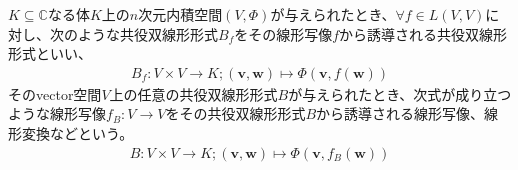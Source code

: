 \documentclass[dvipdfmx]{jsarticle}
\begin{document}
\begin{dfn}
$K \subseteq \mathbb{C}$なる体$K$上の$n$次元内積空間$(V,\varPhi)$が与えられたとき、$\forall f \in L(V,V)$に対し、次のような共役双線形形式$B_{f}$をその線形写像$f$から誘導される共役双線形形式といい、
\begin{align*}
B_{f}:V \times V \rightarrow K;\left( \mathbf{v},\mathbf{w} \right) \mapsto \varPhi\left( \mathbf{v},f\left( \mathbf{w} \right) \right)
\end{align*}
そのvector空間$V$上の任意の共役双線形形式$B$が与えられたとき、次式が成り立つような線形写像$f_{B}:V \rightarrow V$をその共役双線形形式$B$から誘導される線形写像、線形変換などという。
\begin{align*}
B:V \times V \rightarrow K;\left( \mathbf{v},\mathbf{w} \right) \mapsto \varPhi\left( \mathbf{v},f_{B}\left( \mathbf{w} \right) \right)
\end{align*}
\end{dfn}
\end{document}

